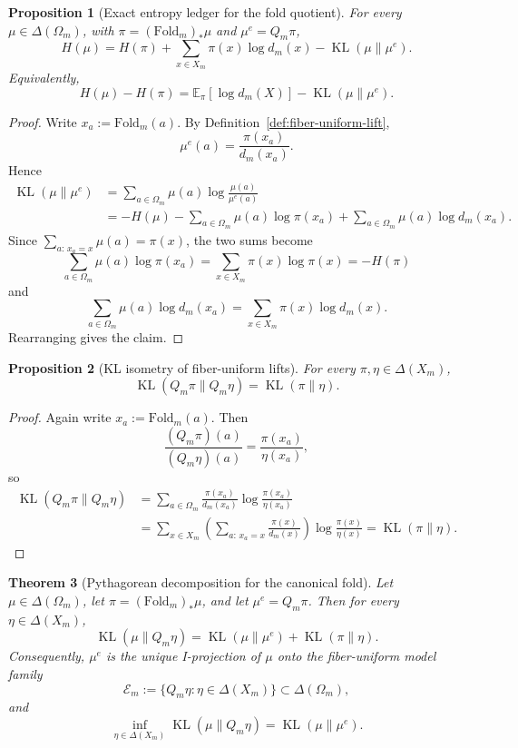 \documentclass[11pt,letterpaper]{article}
\numberwithin{equation}{section}
\theoremstyle{plain}
\newtheorem{theorem}{Theorem}[section]
\newtheorem{proposition}[theorem]{Proposition}
\theoremstyle{definition}
\theoremstyle{remark}
\newcommand{\Fold}{\mathrm{Fold}}
\DeclareMathOperator{\KL}{KL}
\begin{document}
\begin{proposition}[Exact entropy ledger for the fold quotient]\label{prop:fold-entropy-ledger}
For every \(\mu\in\Delta(\Omega_m)\), with \(\pi=(\Fold_m)_*\mu\) and
\(\mu^e=Q_m\pi\),
\[
H(\mu)
=
H(\pi)+\sum_{x\in X_m}\pi(x)\log d_m(x)-\KL(\mu\|\mu^e).
\]
Equivalently,
\[
H(\mu)-H(\pi)
=
\mathbb{E}_{\pi}[\log d_m(X)]-\KL(\mu\|\mu^e).
\]
\end{proposition}

\begin{proof}
Write \(x_a:=\Fold_m(a)\). By Definition~\ref{def:fiber-uniform-lift},
\[
\mu^e(a)=\frac{\pi(x_a)}{d_m(x_a)}.
\]
Hence
\[
\begin{aligned}
\KL(\mu\|\mu^e)
&=
\sum_{a\in\Omega_m}\mu(a)\log\frac{\mu(a)}{\mu^e(a)}\\
&=
-H(\mu)-\sum_{a\in\Omega_m}\mu(a)\log\pi(x_a)
+\sum_{a\in\Omega_m}\mu(a)\log d_m(x_a).
\end{aligned}
\]
Since \(\sum_{a:\,x_a=x}\mu(a)=\pi(x)\), the two sums become
\[
\sum_{a\in\Omega_m}\mu(a)\log\pi(x_a)=\sum_{x\in X_m}\pi(x)\log\pi(x)=-H(\pi)
\]
and
\[
\sum_{a\in\Omega_m}\mu(a)\log d_m(x_a)
=
\sum_{x\in X_m}\pi(x)\log d_m(x).
\]
Rearranging gives the claim.
\end{proof}

\begin{proposition}[KL isometry of fiber-uniform lifts]\label{prop:fold-fiber-lift-kl-isometry}
For every \(\pi,\eta\in\Delta(X_m)\),
\[
\KL(Q_m\pi\|Q_m\eta)=\KL(\pi\|\eta).
\]
\end{proposition}

\begin{proof}
Again write \(x_a:=\Fold_m(a)\). Then
\[
\frac{(Q_m\pi)(a)}{(Q_m\eta)(a)}
=
\frac{\pi(x_a)}{\eta(x_a)},
\]
so
\[
\begin{aligned}
\KL(Q_m\pi\|Q_m\eta)
&=
\sum_{a\in\Omega_m}\frac{\pi(x_a)}{d_m(x_a)}
\log\frac{\pi(x_a)}{\eta(x_a)}\\
&=
\sum_{x\in X_m}
\left(\sum_{a:\,x_a=x}\frac{\pi(x)}{d_m(x)}\right)
\log\frac{\pi(x)}{\eta(x)}
=
\KL(\pi\|\eta).
\end{aligned}
\]
\end{proof}

\begin{theorem}[Pythagorean decomposition for the canonical fold]\label{thm:fold-kl-pythagoras}
Let \(\mu\in\Delta(\Omega_m)\), let \(\pi=(\Fold_m)_*\mu\), and let
\(\mu^e=Q_m\pi\). Then for every \(\eta\in\Delta(X_m)\),
\[
\KL(\mu\|Q_m\eta)
=
\KL(\mu\|\mu^e)+\KL(\pi\|\eta).
\]
Consequently, \(\mu^e\) is the unique I-projection of \(\mu\) onto the
fiber-uniform model family
\[
\mathcal E_m:=\{Q_m\eta:\eta\in\Delta(X_m)\}\subset\Delta(\Omega_m),
\]
and
\[
\inf_{\eta\in\Delta(X_m)}\KL(\mu\|Q_m\eta)=\KL(\mu\|\mu^e).
\]
\end{theorem}
\end{document}
